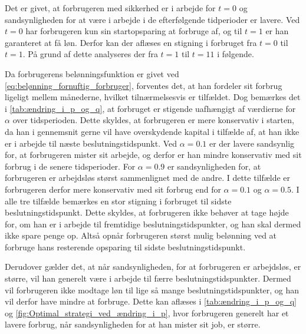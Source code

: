 Det er givet, at forbrugeren med sikkerhed er i arbejde for $t=0$ og sandsynligheden for at være i arbejde i de efterfølgende tidperioder er lavere. Ved $t=0$ har forbrugeren kun sin startopsparing at forbruge af, og til $t=1$ er han garanteret at få løn. Derfor kan der aflæses en stigning i forbruget fra $t=0$ til $t=1$. På grund af dette analyseres der fra $t=1$ til $t=11$ i følgende. 

Da forbrugerens belønningsfunktion er givet ved \eqref{eq:belønning_fornuftig_forbruger}, forventes det, at han fordeler sit forbrug ligeligt mellem månederne, hvilket tilnærmelsesvis er tilfældet. Dog bemærkes det i \autoref{tab:ændring_i_p_og_q}, at forbruget er stigende uafhængigt af værdierne for $\alpha$ over tidsperioden. Dette skyldes, at forbrugeren er mere konservativ i starten, da han i gennemsnit gerne vil have overskydende kapital i tilfælde af, at han ikke er i arbejde til næste beslutningstidspunkt. 
Ved $\alpha=0.1$ er der lavere sandsynlig for, at forbrugeren mister sit arbejde, og derfor er han mindre konservativ med sit forbrug i de senere tidsperioder. For $\alpha=0.9$ er sandsynligheden for, at forbrugeren er arbejdsløs størst sammenlignet med de andre. I dette tilfælde er forbrugeren derfor mere konservativ med sit forbrug end for $\alpha=0.1$ og $\alpha=0.5$. I alle tre tilfælde bemærkes en stor stigning i forbruget til sidste beslutningstidspunkt. Dette skyldes, at forbrugeren ikke behøver at tage højde for, om han er i arbejde til fremtidige beslutningstidspunkter, og han skal dermed ikke spare penge op. Altså opnår forbrugeren størst mulig belønning ved at forbruge hans resterende opsparing til sidste beslutningstidspunkt.

Derudover gælder det, at når sandsynligheden, for at forbrugeren er arbejdsløs, er større, vil han generelt være i arbejde til færre beslutningstidspunkter. Dermed vil forbrugeren ikke modtage løn til lige så mange beslutningstidspunkter, og han vil derfor have mindre at forbruge. Dette kan aflæses i \autoref{tab:ændring_i_p_og_q} og \autoref{fig:Optimal_strategi_ved_ændring_i_p}, hvor forbrugeren generelt har et lavere forbrug, når sandsynligheden for at han mister sit job, er større. 


